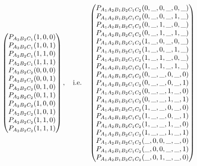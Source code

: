 \documentclass[aps,english,10pt,superscriptaddress,onecolumn,twoside,longbibliography,pra,floatfix,fleqn,nofootinbib]{revtex4-1}%
\theoremstyle{definition}
\newcommand{\p}[2][]{{P_{#1}}\parenths{#2}}
\DeclarePairedDelimiter{\parenths}{\lparen}{\rparen}
\begin{document}
\begin{align}
{\begin{pmatrix}
 \p[A_2 B_2 C_1]{1,0,0} \\
 \p[A_2 B_2 C_1]{1,0,1} \\
 \p[A_2 B_2 C_1]{1,1,0} \\
 \p[A_2 B_2 C_1]{1,1,1} \\
 \p[A_2 B_2 C_2]{0,0,0} \\
 \p[A_2 B_2 C_2]{0,0,1} \\
 \p[A_2 B_2 C_2]{0,1,0} \\
 \p[A_2 B_2 C_2]{0,1,1} \\
 \p[A_2 B_2 C_2]{1,0,0} \\
 \p[A_2 B_2 C_2]{1,0,1} \\
 \p[A_2 B_2 C_2]{1,1,0} \\
 \p[A_2 B_2 C_2]{1,1,1} \\
\end{pmatrix},
\quad\text{i.e.}\quad
\begin{pmatrix}
 \p[A_1 A_2 B_1 B_2 C_1 C_2]{0,\_,0,\_,0,\_} \\
 \p[A_1 A_2 B_1 B_2 C_1 C_2]{0,\_,0,\_,1,\_} \\
 \p[A_1 A_2 B_1 B_2 C_1 C_2]{0,\_,1,\_,0,\_} \\
 \p[A_1 A_2 B_1 B_2 C_1 C_2]{0,\_,1,\_,1,\_} \\
 \p[A_1 A_2 B_1 B_2 C_1 C_2]{1,\_,0,\_,0,\_} \\
 \p[A_1 A_2 B_1 B_2 C_1 C_2]{1,\_,0,\_,1,\_} \\
 \p[A_1 A_2 B_1 B_2 C_1 C_2]{1,\_,1,\_,0,\_} \\
 \p[A_1 A_2 B_1 B_2 C_1 C_2]{1,\_,1,\_,1,\_} \\
 \p[A_1 A_2 B_1 B_2 C_1 C_2]{0,\_,\_,0,\_,0} \\
 \p[A_1 A_2 B_1 B_2 C_1 C_2]{0,\_,\_,0,\_,1} \\
 \p[A_1 A_2 B_1 B_2 C_1 C_2]{0,\_,\_,1,\_,0} \\
 \p[A_1 A_2 B_1 B_2 C_1 C_2]{0,\_,\_,1,\_,1} \\
 \p[A_1 A_2 B_1 B_2 C_1 C_2]{1,\_,\_,0,\_,0} \\
 \p[A_1 A_2 B_1 B_2 C_1 C_2]{1,\_,\_,0,\_,1} \\
 \p[A_1 A_2 B_1 B_2 C_1 C_2]{1,\_,\_,1,\_,0} \\
 \p[A_1 A_2 B_1 B_2 C_1 C_2]{1,\_,\_,1,\_,1} \\
 \p[A_1 A_2 B_1 B_2 C_1 C_2]{\_,0,0,\_,\_,0} \\
 \p[A_1 A_2 B_1 B_2 C_1 C_2]{\_,0,0,\_,\_,1} \\
 \p[A_1 A_2 B_1 B_2 C_1 C_2]{\_,0,1,\_,\_,0} \\

\end{pmatrix}}
\end{align}
\end{document}
